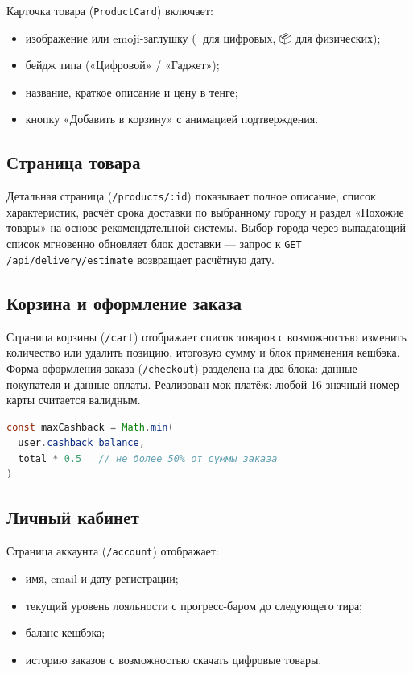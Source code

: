 \documentclass[14pt,a4paper]{extreport}
\begin{document}
Карточка товара (\texttt{ProductCard}) включает:
\begin{itemize}
  \item изображение или emoji-заглушку (💾 для цифровых, 📦 для физических);
  \item бейдж типа («Цифровой» / «Гаджет»);
  \item название, краткое описание и цену в тенге;
  \item кнопку «Добавить в корзину» с анимацией подтверждения.
\end{itemize}

\subsection{Страница товара}

Детальная страница (\texttt{/products/:id}) показывает полное описание, список характеристик, расчёт срока доставки по выбранному городу и раздел «Похожие товары» на основе рекомендательной системы. Выбор города через выпадающий список мгновенно обновляет блок доставки — запрос к \texttt{GET /api/delivery/estimate} возвращает расчётную дату.

\subsection{Корзина и оформление заказа}

Страница корзины (\texttt{/cart}) отображает список товаров с возможностью изменить количество или удалить позицию, итоговую сумму и блок применения кешбэка. Форма оформления заказа (\texttt{/checkout}) разделена на два блока: данные покупателя и данные оплаты. Реализован мок-платёж: любой 16-значный номер карты считается валидным.

\begin{lstlisting}[language=Java, caption={Применение кешбэка при оформлении заказа (Checkout.jsx)}]
const maxCashback = Math.min(
  user.cashback_balance,
  total * 0.5   // не более 50% от суммы заказа
)
\end{lstlisting}

\subsection{Личный кабинет}

Страница аккаунта (\texttt{/account}) отображает:
\begin{itemize}
  \item имя, email и дату регистрации;
  \item текущий уровень лояльности с прогресс-баром до следующего тира;
  \item баланс кешбэка;
  \item историю заказов с возможностью скачать цифровые товары.
\end{itemize}
\end{document}
